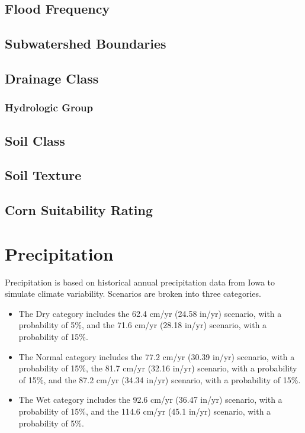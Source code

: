 \documentclass[11pt]{article}
\begin{document}
\subsection{Flood Frequency}

\subsection{Subwatershed Boundaries}

\subsection{Drainage Class}

\subsubsection{Hydrologic Group}

\subsection{Soil Class}

\subsection{Soil Texture}

\subsection{Corn Suitability Rating}


\newpage
\section{Precipitation}
Precipitation is based on historical annual precipitation data from Iowa to simulate climate variability. Scenarios are broken into three categories. 
\begin{itemize}
  \item The Dry category includes the 62.4 cm/yr (24.58 in/yr) scenario, with a probability of 5\%, and the 71.6 cm/yr (28.18 in/yr) scenario, with a probability of 15\%. 
  \item The Normal category includes the 77.2 cm/yr (30.39 in/yr) scenario, with a probability of 15\%, the 81.7 cm/yr (32.16 in/yr) scenario, with a probability of 15\%, and the 87.2 cm/yr (34.34 in/yr) scenario, with a probability of 15\%.
  \item The Wet category includes the 92.6 cm/yr (36.47 in/yr) scenario, with a probability of 15\%, and the 114.6 cm/yr (45.1 in/yr) scenario, with a probability of 5\%.
\end{itemize}
\end{document}
